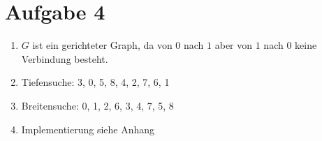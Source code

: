 \section*{Aufgabe 4}
\begin{enumerate}[nolistsep, noitemsep, label=\alph*)]
	\item $G$ ist ein gerichteter Graph, da von $0$ nach $1$ aber von $1$ nach $0$ keine Verbindung besteht. 
    \item Tiefensuche: 3, 0, 5, 8, 4, 2, 7, 6, 1
    \item[] Breitensuche: 0, 1, 2, 6, 3, 4, 7, 5, 8
    \item Implementierung siehe Anhang
\end{enumerate}
